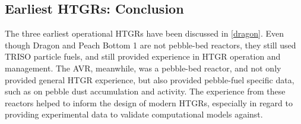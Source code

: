 


\subsection{Earliest HTGRs: Conclusion}

The three earliest operational HTGRs have been discussed in \autoref{dragon}.  Even though Dragon and Peach Bottom 1 are not pebble-bed reactors, they still used TRISO particle fuels, and still provided experience in HTGR operation and management.  The AVR, meanwhile, was a pebble-bed reactor, and not only provided general HTGR experience, but also provided pebble-fuel specific data, such as on pebble dust accumulation and activity.  The experience from these reactors helped to inform the design of modern HTGRs, especially in regard to providing experimental data to validate computational models against.